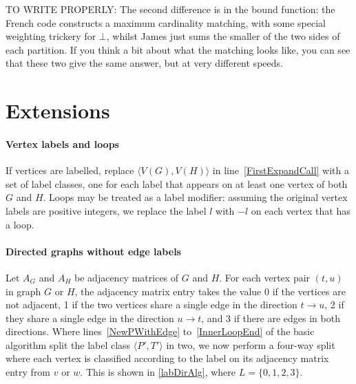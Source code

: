 \documentclass[letterpaper]{article}
\newcommand{\lineref}[1]{line~\ref{#1}}
\newcommand{\linerangeref}[2]{lines~\ref{#1} to~\ref{#2}}
\begin{document}
TO WRITE PROPERLY: The second difference is in the bound function: the French
code constructs a maximum cardinality matching, with some special weighting
trickery for $\bot$, whilst James just sums the smaller of the two sides of
each partition. If you think a bit about what the matching looks like, you can
see that these two give the same answer, but at very different speeds.

\section{Extensions}\label{sec:extensions}

\paragraph{Vertex labels and loops} If vertices are labelled, replace ${\langle
V(G),V(H) \rangle}$ in \lineref{FirstExpandCall} with a set of label classes,
one for each label that appears on at least one vertex of both $G$ and $H$.
Loops may be treated as a label modifier: assuming the original vertex labels
are positive integers, we replace the label $l$ with $-l$ on each vertex that
has a loop.

\paragraph{Directed graphs without edge labels} Let $A_G$ and $A_H$ be
adjacency matrices of $G$ and $H$. For each vertex pair $(t,u)$ in graph $G$ or
$H$, the adjacency matrix entry takes the value 0 if the vertices are not
adjacent, 1 if the two vertices share a single edge in the direction $t
\rightarrow u$, 2 if they share a single edge in the direction $u \rightarrow
t$, and 3 if there are edges in both directions. Where
\linerangeref{NewPWithEdge}{InnerLoopEnd} of the basic algorithm split the
label class $\langle P',T' \rangle$ in two, we now perform a four-way split
where each vertex is classified according to the label on its adjacency matrix
entry from $v$ or $w$.  This is shown in \cref{labDirAlg}, where
$L=\{0,1,2,3\}$.

\begin{algorithm}
\DontPrintSemicolon
\nl    {}
\caption{Replacement for \linerangeref{NewPWithEdge}{InnerLoopEnd} in directed and labelled cases}
\label{labDirAlg}
\end{algorithm}
\end{document}
